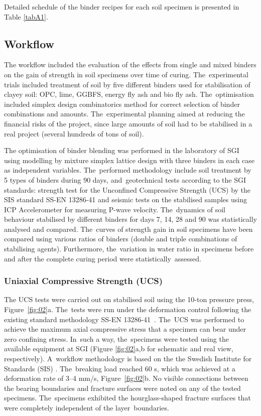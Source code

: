 \documentclass[materials,article,accept,pdftex,moreauthors]{Definitions/mdpi}
\begin{document}
Detailed schedule of the binder recipes for each soil specimen is presented in Table \ref{tabA1}. 

\subsection{Workflow}

The workflow included the evaluation of the effects from single and mixed binders on the gain of strength in soil specimens over time of curing. The~experimental trials included treatment of soil by five different binders used for stabilisation of clayey soil: OPC, lime, GGBFS, energy fly ash and bio fly ash. The~optimisation included simplex design combinatorics method for correct selection of binder combinations and amounts. The~experimental planning aimed at reducing the financial risks of the project, since large amounts of soil had to be stabilised in a real project (several hundreds of tons of soil). 

The optimisation of binder blending was performed in the laboratory of SGI using modelling by mixture simplex lattice design with three binders in each case as independent variables. The~performed methodology include soil treatment by 5 types of binders during 90 days, and~geotechnical tests according to the SGI standards: strength test for the Unconfined Compressive Strength (UCS) by the SIS standard SS-EN 13286-41 and seismic tests on the stabilised samples using ICP Accelerometer for measuring P-wave velocity. The~dynamics of soil behaviour stabilised by different binders for days 7, 14, 28 and 90 was statistically analysed and compared. The~curves of strength gain in soil specimens have been compared using various ratios of binders (double and triple combinations of stabilising agents). Furthermore, the~variation in water ratio in specimens before and after the complete curing period were statistically~assessed.

\subsubsection{Uniaxial Compressive Strength (UCS)}
The UCS tests were carried out on stabilised soil using the 10-ton pressure press, Figure~\ref{fig:02}a. The~tests were run under the deformation control following the existing standard methodology SS-EN 13286-41~\cite{SIS2003,SIS2018}. The~UCS was performed to achieve the maximum axial compressive stress that a specimen can bear under zero confining stress. In~such a way, the~specimens were tested using the available equipment at SGI (Figure \ref{fig:02}a,b for schematic and real view, respectively). A~workflow methodology is based on the the Swedish Institute for Standards (SIS) \cite{SIS2003,SIS2018}. The~breaking load reached 60 s, which was achieved at a deformation rate of 3--4 mm/s, Figure~\ref{fig:02}b. No visible connections between the bearing boundaries and fracture surfaces were noted on any of the tested specimens. The~specimens exhibited the hourglass-shaped fracture surfaces that were completely independent of the layer~boundaries. 
\end{document}
